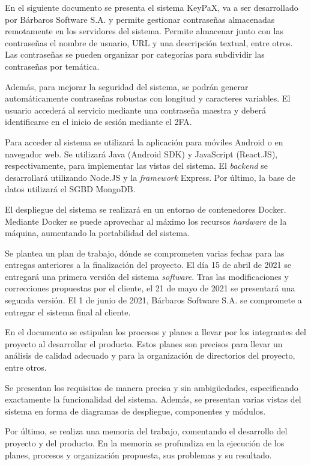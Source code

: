 \documentclass{article}
\begin{document}
En el siguiente documento se presenta el sistema KeyPaX, va a ser desarrollado por Bárbaros Software S.A. y permite gestionar contraseñas almacenadas remotamente en los servidores del sistema. Permite almacenar junto con las contraseñas el nombre de usuario, URL y una descripción textual, entre otros. Las contraseñas se pueden organizar por categorías para subdividir las contraseñas por temática.

Además, para mejorar la seguridad del sistema, se podrán generar automáticamente contraseñas robustas con longitud y caracteres variables. El usuario accederá al servicio mediante una contraseña maestra y deberá identificarse en el inicio de sesión mediante el 2FA.

Para acceder al sistema se utilizará la aplicación para móviles Android o en navegador web. Se utilizará Java (Android SDK) y JavaScript (React.JS), respectivamente, para implementar las vistas del sistema. El \textit{backend} se desarrollará utilizando Node.JS y la \textit{framework} Express. Por último, la base de datos utilizará el SGBD MongoDB.

El despliegue del sistema se realizará en un entorno de contenedores Docker. Mediante Docker se puede aprovechar al máximo los recursos \textit{hardware} de la máquina, aumentando la portabilidad del sistema.

Se plantea un plan de trabajo, dónde se comprometen varias fechas para las entregas anteriores a la finalización del proyecto.  El día 15 de abril de 2021 se entregará una primera versión del sistema \textit{software}. Tras las modificaciones y correcciones propuestas por el cliente, el 21 de mayo de 2021 se presentará una segunda versión. El 1 de junio de 2021, Bárbaros Software S.A. se compromete a entregar el sistema final al cliente.

En el documento se estipulan los procesos y planes a llevar por los integrantes del proyecto al desarrollar el producto. Estos planes son precisos para llevar un análisis de calidad adecuado y para la organización de directorios del proyecto, entre otros.

Se presentan los requisitos de manera precisa y sin ambigüedades, especificando exactamente la funcionalidad del sistema. Además, se presentan varias vistas del sistema en forma de diagramas de despliegue, componentes y módulos.

Por último, se realiza una memoria del trabajo, comentando el desarrollo del proyecto y del producto. En la memoria se profundiza en la ejecución de los planes, procesos y organización propuesta, sus problemas y su resultado.
\end{document}
